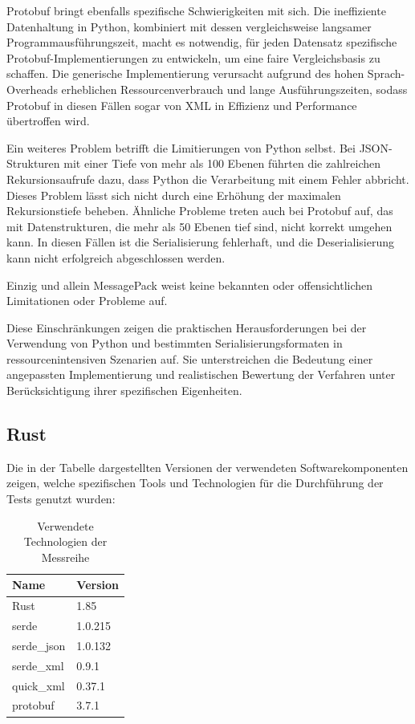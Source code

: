 \documentclass[ngerman]{seminarvorlage}
\begin{document}
Protobuf bringt ebenfalls spezifische Schwierigkeiten mit sich. Die ineffiziente Datenhaltung in Python, kombiniert mit dessen vergleichsweise langsamer Programmausführungszeit, macht es notwendig, für jeden Datensatz spezifische Protobuf-Implementierungen zu entwickeln, um eine faire Vergleichsbasis zu schaffen. Die generische Implementierung verursacht aufgrund des hohen Sprach-Overheads erheblichen Ressourcenverbrauch und lange Ausführungszeiten, sodass Protobuf in diesen Fällen sogar von XML in Effizienz und Performance übertroffen wird.

Ein weiteres Problem betrifft die Limitierungen von Python selbst. Bei JSON-Strukturen mit einer Tiefe von mehr als 100 Ebenen führten die zahlreichen Rekursionsaufrufe dazu, dass Python die Verarbeitung mit einem Fehler abbricht. Dieses Problem lässt sich nicht durch eine Erhöhung der maximalen Rekursionstiefe beheben. Ähnliche Probleme treten auch bei Protobuf auf, das mit Datenstrukturen, die mehr als 50 Ebenen tief sind, nicht korrekt umgehen kann. In diesen Fällen ist die Serialisierung fehlerhaft, und die Deserialisierung kann nicht erfolgreich abgeschlossen werden.

Einzig und allein MessagePack weist keine bekannten oder offensichtlichen Limitationen oder Probleme auf.

Diese Einschränkungen zeigen die praktischen Herausforderungen bei der Verwendung von Python und bestimmten Serialisierungsformaten in ressourcenintensiven Szenarien auf. Sie unterstreichen die Bedeutung einer angepassten Implementierung und realistischen Bewertung der Verfahren unter Berücksichtigung ihrer spezifischen Eigenheiten.

\subsection{Rust}

Die in der Tabelle dargestellten Versionen der verwendeten Softwarekomponenten zeigen, welche spezifischen Tools und Technologien für die Durchführung der Tests genutzt wurden:

\begin{table}[H]
    \centering
    \begin{tabular}{|l|l|}
    \hline
    \textbf{Name} & \textbf{Version} \\ \hline
    Rust          & 1.85             \\ \hline
    serde         & 1.0.215          \\ \hline
    serde\_json   & 1.0.132          \\ \hline
    serde\_xml    & 0.9.1            \\ \hline
    quick\_xml    & 0.37.1           \\ \hline
    protobuf      & 3.7.1            \\ \hline
    \end{tabular}
    \caption{Verwendete Technologien der Messreihe}
\end{table}
\end{document}
